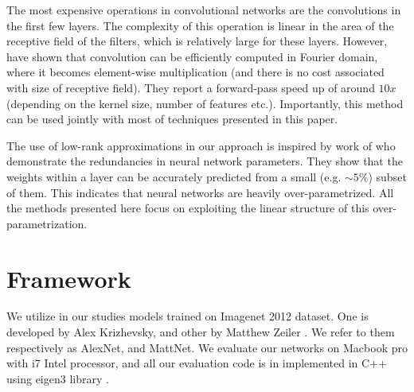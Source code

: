 


The most expensive operations in convolutional networks are the
convolutions in the first few layers. The complexity of this operation
is linear in the area of the receptive field of the filters, which is
relatively large for these layers.  However, \cite{mathieu2013fast} have shown that convolution can be
efficiently computed in Fourier domain, where it becomes element-wise
multiplication (and there is no cost associated with size of receptive
field). They report a forward-pass speed up of around $10x$ (depending on
the kernel size, number of features etc.).  Importantly, this method can
be used jointly with most of techniques presented in this paper.

The use of low-rank approximations in our approach is inspired by work
of \cite{denil2013predicting} who demonstrate the redundancies in neural
network parameters. They show that the weights within a layer can be
accurately predicted from a small (e.g. $\sim 5\%$) subset of them. This
indicates that neural networks are heavily over-parametrized.  All the
methods presented here focus on exploiting the linear structure of this
over-parametrization.

\section{Framework}
We utilize in our studies models trained on Imagenet 2012 dataset. One is developed
by Alex Krizhevsky\cite{krizhevsky2012imagenet}, and other by Matthew Zeiler \cite{zeiler2013visualizing}.
We refer to them respectively as AlexNet, and MattNet. We evaluate our networks on Macbook pro with i7 Intel processor, and
all our evaluation code is in implemented in C++ using eigen3 library \cite{eigenweb}.
